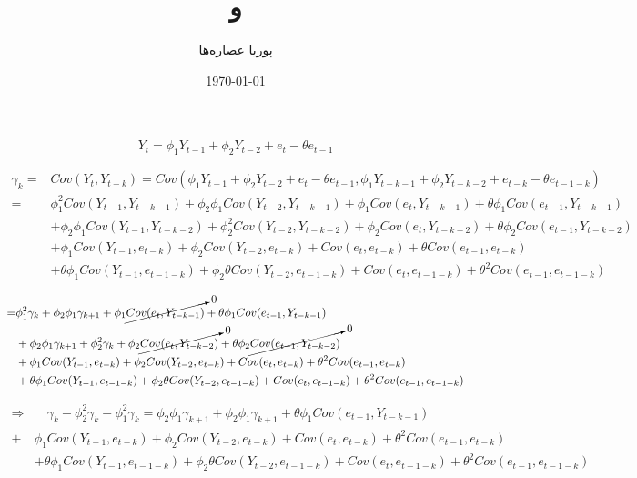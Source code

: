 \documentclass{article}
\title{
    \lr{ARMA(2,1)} و
    \lr{ARMA(1,2)}
}
\author{پوریا عصاره‌ها}
\date{\today}
\begin{document}
\maketitle

\section{}
\[ Y_t = \phi_1 Y_{t-1} + \phi_2 Y_{t-2} + e_t - \theta e_{t-1} \]

\begin{align*}
\gamma_k = & Cov(Y_t, Y_{t-k}) = Cov\left(  \phi_1 Y_{t-1} + \phi_2 Y_{t-2} + e_t - \theta e_{t-1} ,
                                            \phi_1 Y_{t-k-1} + \phi_2 Y_{t-k-2} + e_{t-k} - \theta e_{t-1-k}\right) \\
= & \phi_1^2 Cov(Y_{t-1}, Y_{t-k-1}) 
+   \phi_2\phi_1 Cov(Y_{t-2}, Y_{t-k-1}) 
+   \phi_1 Cov(e_t, Y_{t-k-1}) 
+   \theta \phi_1 Cov(e_{t-1}, Y_{t-k-1}) 
  \\ &
+   \phi_2\phi_1 Cov(Y_{t-1}, Y_{t-k-2}) 
+   \phi_2^2 Cov(Y_{t-2}, Y_{t-k-2}) 
+   \phi_2 Cov(e_t, Y_{t-k-2}) 
+   \theta \phi_2 Cov(e_{t-1}, Y_{t-k-2}) 
   \\ &
+   \phi_1 Cov(Y_{t-1}, e_{t-k}) 
+   \phi_2 Cov(Y_{t-2}, e_{t-k}) 
+   Cov(e_t, e_{t-k}) 
+   \theta Cov(e_{t-1}, e_{t-k}) 
   \\ &
+   \theta\phi_1  Cov(Y_{t-1}, e_{t-1-k}) 
+   \phi_2\theta Cov(Y_{t-2}, e_{t-1-k}) 
+   Cov(e_t, e_{t-1-k}) 
+   \theta^2 Cov(e_{t-1}, e_{t-1-k}) 
\end{align*}

\begin{align*}    
 = & \phi_1^2 \gamma_k 
 +   \phi_2\phi_1 \gamma_{k+1} 
 +   \phi_1 \cancelto{0}{Cov(e_t, Y_{t-k-1})} 
 +   \theta \phi_1 Cov(e_{t-1}, Y_{t-k-1}) 
   \\ &
 +   \phi_2\phi_1 \gamma_{k+1}
 +   \phi_2^2 \gamma_k
 +   \phi_2 \cancelto{0}{Cov(e_t, Y_{t-k-2})} 
 +   \theta \phi_2 \cancelto{0}{Cov(e_{t-1}, Y_{t-k-2})}
    \\ &
 +   \phi_1 Cov(Y_{t-1}, e_{t-k}) 
 +   \phi_2 Cov(Y_{t-2}, e_{t-k}) 
 +   Cov(e_t, e_{t-k}) 
 +   \theta^2 Cov(e_{t-1}, e_{t-k}) 
    \\ &
 +   \theta\phi_1  Cov(Y_{t-1}, e_{t-1-k}) 
 +   \phi_2\theta Cov(Y_{t-2}, e_{t-1-k}) 
 +   Cov(e_t, e_{t-1-k}) 
 +   \theta^2 Cov(e_{t-1}, e_{t-1-k}) 
\end{align*}

\begin{align*}
 \Rightarrow & \quad 
 \gamma_k - \phi_2^2 \gamma_k - \phi_1^2 \gamma_k = \phi_2\phi_1 \gamma_{k+1} + \phi_2\phi_1 \gamma_{k+1} + \theta \phi_1 Cov(e_{t-1}, Y_{t-k-1})  \\
 + & \phi_1 Cov(Y_{t-1}, e_{t-k}) 
 +   \phi_2 Cov(Y_{t-2}, e_{t-k}) 
 +   Cov(e_t, e_{t-k}) 
 +   \theta^2 Cov(e_{t-1}, e_{t-k}) 
    \\ &
 +   \theta\phi_1  Cov(Y_{t-1}, e_{t-1-k}) 
 +   \phi_2\theta Cov(Y_{t-2}, e_{t-1-k}) 
 +   Cov(e_t, e_{t-1-k}) 
 +   \theta^2 Cov(e_{t-1}, e_{t-1-k}) 
 \\ 
\end{align*}
\end{document}
